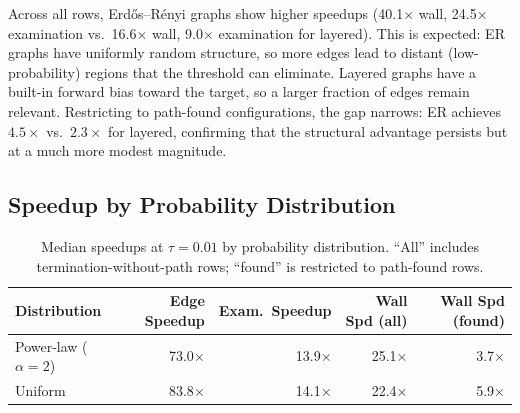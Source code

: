 \begin{table}[htbp]
\centering
\renewcommand{\arraystretch}{1.3}
\caption[Speedup by graph type]{Median speedups at $\tau = 0.01$ by graph type. ``All'' includes termination-without-path rows.}
\label{table:speedup_graph_type}
\end{table}

Across all rows, Erd\H{o}s--R\'{e}nyi graphs show higher speedups (40.1$\times$ wall, 24.5$\times$ examination vs.\ 16.6$\times$ wall, 9.0$\times$ examination for layered). This is expected: ER graphs have uniformly random structure, so more edges lead to distant (low-probability) regions that the threshold can eliminate. Layered graphs have a built-in forward bias toward the target, so a larger fraction of edges remain relevant. Restricting to path-found configurations, the gap narrows: ER achieves $4.5\times$ vs.\ $2.3\times$ for layered, confirming that the structural advantage persists but at a much more modest magnitude.

\subsection{Speedup by Probability Distribution}

\begin{table}[htbp]
\centering
\renewcommand{\arraystretch}{1.3}
\begin{tabular}{@{}lrrrr@{}}
\toprule
\textbf{Distribution} & \textbf{Edge Speedup} & \textbf{Exam.\ Speedup} & \textbf{Wall Spd (all)} & \textbf{Wall Spd (found)} \\
\midrule
Power-law ($\alpha=2$) & 73.0$\times$ & 13.9$\times$ & 25.1$\times$ & 3.7$\times$ \\
Uniform                & 83.8$\times$ & 14.1$\times$ & 22.4$\times$ & 5.9$\times$ \\
\bottomrule
\end{tabular}
\caption[Speedup by probability distribution]{Median speedups at $\tau = 0.01$ by probability distribution. ``All'' includes termination-without-path rows; ``found'' is restricted to path-found rows.}
\label{table:speedup_dist}
\end{table}

